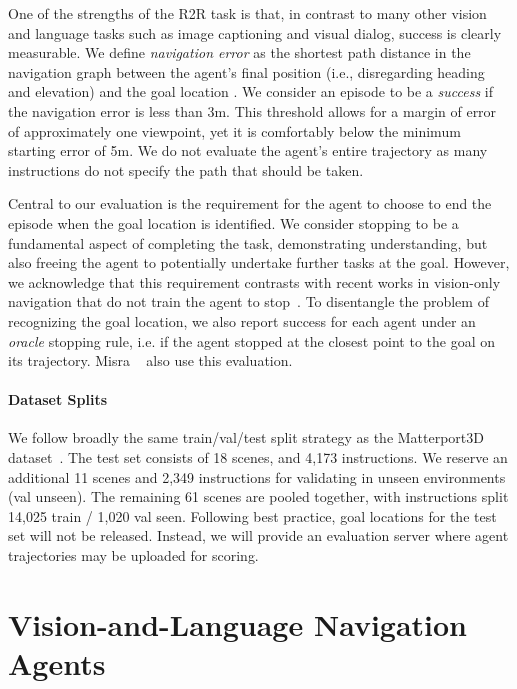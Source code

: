 \documentclass[10pt,twocolumn,letterpaper]{article}
\begin{document}
One of the strengths of the R2R task is that, in contrast to many other vision and language tasks such as image captioning and visual dialog, success is clearly measurable. We define \textit{navigation error} as the shortest path distance in the navigation graph  between the agent's final position  (i.e., disregarding heading and elevation) and the goal location . We consider an episode to be a \textit{success} if the navigation error is less than 3m. This threshold allows for a margin of error of approximately one viewpoint, yet it is comfortably below the minimum starting error of 5m. We do not evaluate the agent's entire trajectory as many instructions do not specify the path that should be taken. 

Central to our evaluation is the requirement for the agent to choose to end the episode when the goal location is identified. We consider stopping to be a fundamental aspect of completing the task, demonstrating understanding, but also freeing the agent to potentially undertake further tasks at the goal. However, we acknowledge that this requirement contrasts with recent works in vision-only navigation that do not train the agent to stop~\cite{zhu2017icra,mirowski2016learning}. To disentangle the problem of recognizing the goal location, we also report success for each agent under an \textit{oracle} stopping rule, i.e. if the agent stopped at the closest point to the goal on its trajectory. Misra \etal~\cite{misra2017mapping} also use this evaluation.

\vspace{-0.3cm}
\paragraph{Dataset Splits}

We follow broadly the same train/val/test split strategy as the Matterport3D dataset~\cite{Matterport3D}. The test set consists of 18 scenes, and 4,173 instructions. We reserve an additional 11 scenes and 2,349 instructions for validating in unseen environments (val unseen). The remaining 61 scenes are pooled together, with instructions split 14,025 train / 1,020 val seen. Following best practice, goal locations for the test set will not be released. Instead, we will provide an evaluation server where agent trajectories may be uploaded for scoring. 


 \section{Vision-and-Language Navigation Agents}
\end{document}

